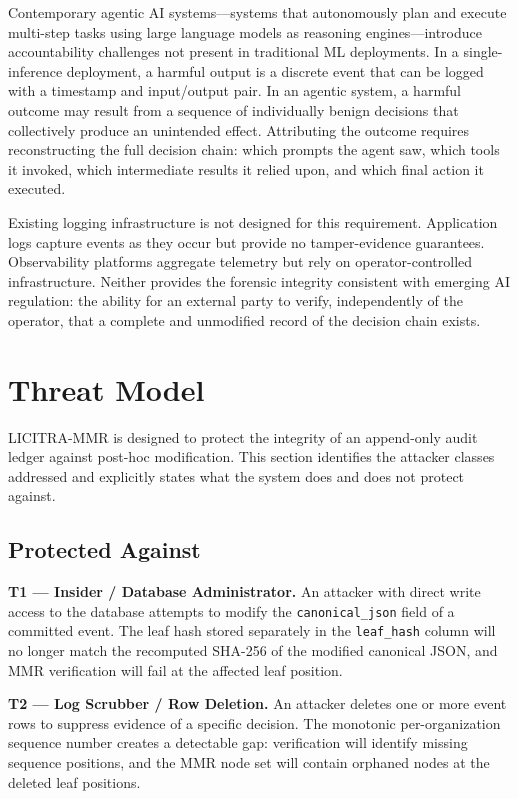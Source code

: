\documentclass{article}
\begin{document}
Contemporary agentic AI systems---systems that autonomously plan and execute
multi-step tasks using large language models as reasoning engines---introduce
accountability challenges not present in traditional ML deployments. In a
single-inference deployment, a harmful output is a discrete event that can be
logged with a timestamp and input/output pair. In an agentic system, a harmful
outcome may result from a sequence of individually benign decisions that
collectively produce an unintended effect. Attributing the outcome requires
reconstructing the full decision chain: which prompts the agent saw, which tools
it invoked, which intermediate results it relied upon, and which final action it
executed.

Existing logging infrastructure is not designed for this requirement. Application
logs capture events as they occur but provide no tamper-evidence guarantees.
Observability platforms aggregate telemetry but rely on operator-controlled
infrastructure. Neither provides the forensic integrity consistent with emerging
AI regulation: the ability for an external party to verify, independently of
the operator, that a complete and unmodified record of the decision chain exists.

\section{Threat Model}

LICITRA-MMR is designed to protect the integrity of an append-only audit ledger
against post-hoc modification. This section identifies the attacker classes
addressed and explicitly states what the system does and does not protect
against.

\subsection{Protected Against}

\textbf{T1 --- Insider / Database Administrator.} An attacker with direct write
access to the database attempts to modify the \texttt{canonical\_json} field of
a committed event. The leaf hash stored separately in the \texttt{leaf\_hash}
column will no longer match the recomputed SHA-256 of the modified canonical
JSON, and MMR verification will fail at the affected leaf position.

\textbf{T2 --- Log Scrubber / Row Deletion.} An attacker deletes one or more
event rows to suppress evidence of a specific decision. The monotonic
per-organization sequence number creates a detectable gap: verification will
identify missing sequence positions, and the MMR node set will contain orphaned
nodes at the deleted leaf positions.
\end{document}
